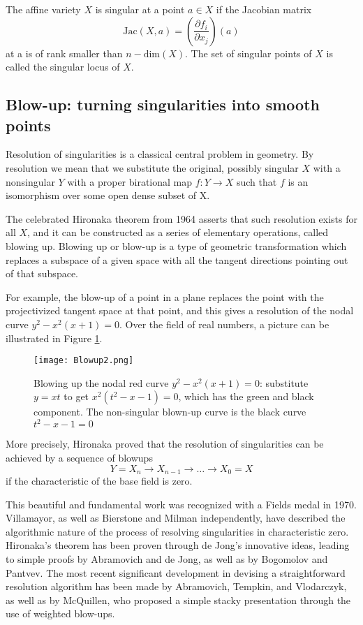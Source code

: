 \documentclass{article}
\theoremstyle{plain}
\theoremstyle{definition}
\theoremstyle{remark}
\begin{document}
The affine variety $X$ is singular at a point $a \in X$ if the Jacobian matrix
$$\mathrm{Jac}(X,a)=\left(\frac{\partial f_i}{\partial x_j}\right)(a)$$
at a is of rank smaller than $n-\text{dim}(X)$. The set of singular points of $X$ is called the singular locus of $X$.


\subsection{Blow-up: turning singularities into smooth points}

Resolution of singularities is a classical central problem in geometry. By resolution we mean that we substitute the original,
possibly singular $X$ with a nonsingular $Y$ with a proper 
birational map $f:Y \to X$ such that $f$ is an isomorphism over some open dense subset of X.

The celebrated Hironaka theorem \cite{hironaka} from 1964 asserts that such resolution exists for all $X$, and it can be constructed as a series of  
elementary operations, called blowing up. Blowing up or blow-up is a type of geometric transformation which replaces a subspace of a given space with all the tangent directions pointing out of that subspace. 

For example, the blow-up of a point in a plane replaces the point 
with the projectivized tangent space at that point, and this gives a resolution of the nodal curve $y^2-x^2(x+1)=0$. Over the field of real numbers, a picture can be illustrated in Figure \ref{fig:blowup}.

\begin{figure}[ht!]
\centering
\texttt{[image: Blowup2.png]}
\caption{Blowing up the nodal red curve $y^2-x^2(x+1)=0$: substitute $y=xt$ to get $x^2(t^2-x-1)=0$, which has the green and black component. The non-singular blown-up curve is the black curve $t^2-x-1=0$}
\label{fig:blowup}
\end{figure}

More precisely, Hironaka proved that the resolution of singularities can be achieved by a sequence of blowups 
$$Y=X_n \to X_{n-1} \to \ldots \to X_0=X$$
if the characteristic of the base field is zero.

This beautiful and fundamental work was recognized with a Fields medal in 1970. Villamayor, as well as Bierstone and Milman independently, have described the algorithmic nature of the process of resolving singularities in characteristic zero. Hironaka's theorem has been proven through de Jong's innovative ideas, leading to simple proofs by Abramovich and de Jong, as well as by Bogomolov and Pantvev. The most recent significant development in devising a straightforward resolution algorithm has been made by Abramovich, Tempkin, and Vlodarczyk, as well as by McQuillen, who proposed a simple stacky presentation through the use of weighted blow-ups. 
\end{document}
